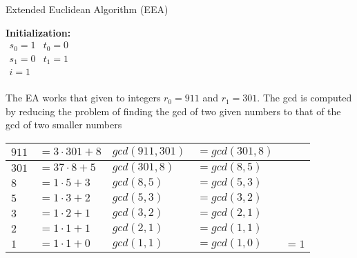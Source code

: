 \begin{center}
\begin{algorithm}[H]
\caption{Extended Euclidean Algorithm (EEA)\label{alg}}



\textbf{Initialization:} \\
$
\begin{array}{ll}
    s_0 = 1   & t_0 = 0 \\
    s_1 = 0   & t_1 = 1 \\
      i = 1     &           \\
\end{array}                 
$

\end{algorithm}
\end{center}


\noindent
The EA works that given to integers $r_0 = 911$ and $r_1 = 301$. The gcd is computed by reducing the problem of finding the gcd of two given numbers to that of the gcd of two smaller numbers 


\begin{center}
\begin{tabular}{|ll|lll| } 
\hline
$911$ & $= 3 \cdot 301 +8$& $gcd(911,301)$ & $= gcd(301,8)$ & \\ 
\hline
$301$ & $= 37 \cdot 8+5$ & $gcd(301,8)$ & $= gcd(8,5)$ &\\ 
\hline
$8$ & $= 1 \cdot 5+3$ & $gcd(8,5)$ & $= gcd(5,3)$ & \\ 
\hline
$5$ & $= 1 \cdot 3+2$ & $gcd(5,3)$ & $= gcd(3,2)$ & \\ 
\hline
$3$ & $= 1 \cdot 2+1$ & $gcd(3,2)$ & $= gcd(2,1)$ & \\ 
\hline
$2$ & $= 1 \cdot 1+1$ & $gcd(2,1)$ & $= gcd(1,1)$ & \\ 
\hline
$1$ & $= 1 \cdot 1+0$ & $gcd(1,1)$ & $= gcd(1,0)$ & $= 1$ \\ 
\hline
\end{tabular}
\end{center}


